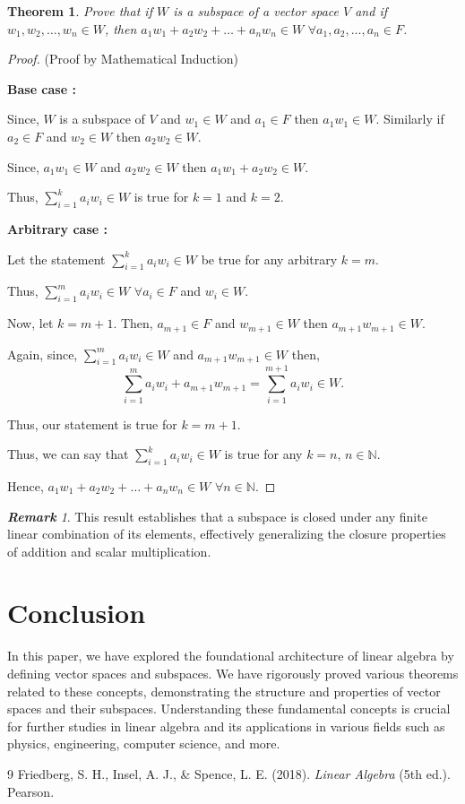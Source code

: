 \documentclass[12pt, a4paper]{article}
\newtheorem{theorem}{Theorem}[section]
\theoremstyle{definition}
\theoremstyle{remark}
\newtheorem*{remark}{\textbf{Remark}}
\theoremstyle{solution}
\begin{document}
\begin{theorem}
    Prove that if $W$ is a subspace of a vector space $V$ and if $w_1, w_2, \dots, w_n \in W$, then $a_1w_1 + a_2w_2 + \dots + a_nw_n \in W \,\, \forall a_1, a_2, \dots, a_n \in F$.
\end{theorem}

\begin{proof}
    (Proof by Mathematical Induction)

\textbf{Base case :}

Since, $W$ is a subspace of $V$ and $w_1 \in W$ and $a_1 \in F$ then $a_1w_1 \in W$. Similarly if $a_2 \in F$ and $w_2 \in W$ then $a_2w_2 \in W$.

Since, $a_1w_1 \in W$ and $a_2w_2 \in W$ then $a_1w_1 + a_2w_2 \in W$.

Thus, $\displaystyle\sum_{i=1}^{k} a_iw_i \in W$ is true for $k=1$ and $k=2$.

\textbf{Arbitrary case :}

Let the statement $\displaystyle\sum_{i=1}^{k} a_iw_i \in W$ be true for any arbitrary $k=m$.

Thus, $\displaystyle\sum_{i=1}^{m} a_iw_i \in W \,\, \forall a_i \in F$ and $w_i \in W$.

Now, let $k=m+1$. Then, $a_{m+1} \in F$ and $w_{m+1} \in W$ then $a_{m+1}w_{m+1} \in W$.

Again, since, $\displaystyle\sum_{i=1}^{m} a_iw_i \in W$ and $a_{m+1}w_{m+1} \in W$ then,
\[ \displaystyle\sum_{i=1}^{m} a_iw_i + a_{m+1}w_{m+1} = \displaystyle\sum_{i=1}^{m+1} a_iw_i \in W. \]

Thus, our statement is true for $k=m+1$.

Thus, we can say that $\displaystyle\sum_{i=1}^{k} a_iw_i \in W$ is true for any $k=n, \, n \in \mathbb{N}$.

Hence, $a_1w_1 + a_2w_2 + \dots + a_nw_n \in W \,\, \forall n \in \mathbb{N}$.
\end{proof}

\begin{remark}
    This result establishes that a subspace is closed under any finite linear combination of its elements, effectively generalizing the closure properties of addition and scalar multiplication.
\end{remark}

\section{Conclusion}
In this paper, we have explored the foundational architecture of linear algebra by defining vector spaces and subspaces. We have rigorously proved various theorems related to these concepts, demonstrating the structure and properties of vector spaces and their subspaces. Understanding these fundamental concepts is crucial for further studies in linear algebra and its applications in various fields such as physics, engineering, computer science, and more.

\begin{thebibliography}{9}
    Friedberg, S. H., Insel, A. J., \& Spence, L. E. (2018). \textit{Linear Algebra} (5th ed.). Pearson.
\end{thebibliography}
\end{document}
